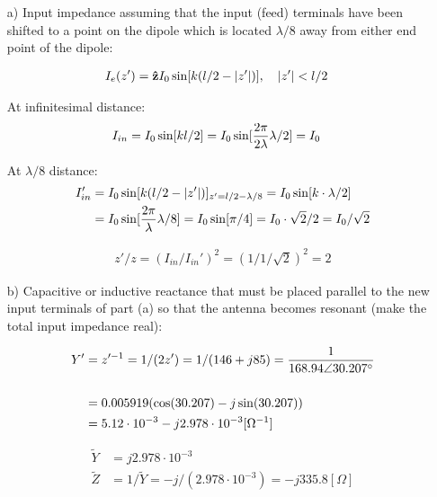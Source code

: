 \documentclass[12pt, letterpaper]{article}
\begin{document}
\begin{itemize}
  \item [a)] Input impedance assuming that the input (feed) terminals have been shifted to a point on the dipole which is located $\lambda/8$ away from either end point of the dipole:

  \begin{align*}
    I_e(z')
    &=
    \vb{\hat{z}}
    I_0
    \sin[k(l/2-|z'|)],
    \quad
    |z'|<l/2
  \end{align*}

  At infinitesimal distance:
  \begin{align*}
    I_{in}
    &=
    I_0
    \sin[kl/2]
    =
    I_0
    \sin[{2\pi\over2\lambda}\lambda/2]
    =
    I_0
  \end{align*}

  At $\lambda/8$ distance:
  \begin{align*}
    I_{in}'
    &=
    I_0
    \sin[k(l/2-|z'|)]_{z'=l/2-\lambda/8}
    =
    I_0
    \sin[k\cdot\lambda/2]
    \\
    &=
    I_0\sin[{2\pi\over\lambda}\lambda/8]
    =
    I_0\sin[\pi/4]
    =
    I_0\cdot\sqrt{2}/2
    =
    I_0/\sqrt{2}
  \end{align*}

  \begin{align*}
    z'/z
    =
    (I_{in}/I_{in}')^2
    =
    (1/1/\sqrt{2})^2
    =
    2
  \end{align*}


  \item [b)] Capacitive or inductive reactance that must be placed parallel to the new input terminals of part (a) so that the antenna becomes resonant (make the total input impedance real):

  \begin{align*}
    Y'
    &=
    z'^{-1}
    =
    1/(2z')
    =
    1/
    (146+j85)
    =
    {
      1
      \over
      168.94\angle30.207^{\circ}
    }
    \\\\
    &=
    0.005919(\cos(30.207)-j\sin(30.207))
    \\
    &=
    5.12\cdot10^{-3}
    -j2.978\cdot10^{-3}
    [\Omega^{-1}]
  \end{align*}

  \begin{align*}
    \tilde{Y}
    &=
    j2.978\cdot10^{-3}
    \\
    \tilde{Z}
    &=
    1/\tilde{Y}
    =
    -j/(2.978\cdot10^{-3})
    =
    -j335.8[\Omega]
  \end{align*}


\end{itemize}
\end{document}
